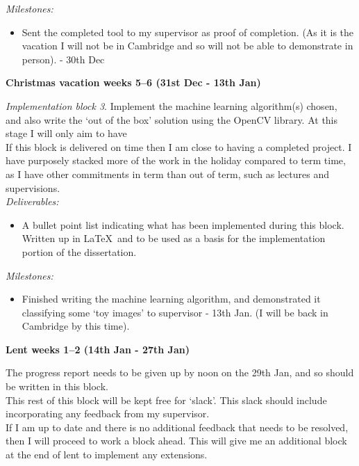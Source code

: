 \documentclass[12pt,a4paper,twoside]{article}
\begin{document}
{\em Milestones:}
\begin{itemize}
    \item 
    Sent the completed tool to my supervisor as proof of completion. (As it is 
    the vacation I will not be in Cambridge and so will not be able to 
    demonstrate in person). - 30th Dec
\end{itemize}




{\bf Christmas vacation weeks 5--6 (31st Dec - 13th Jan)} 

{\em Implementation block 3}. Implement the machine learning algorithm(s) 
chosen, and also write the `out of the box' solution using the OpenCV 
library. At this stage I will only aim to have  \\

If this block is delivered on time then I am close to having a completed 
project. I have purposely stacked more of the work in the holiday compared to 
term time, as I have other commitments in term than out of term, such as 
lectures and supervisions. \\

{\em Deliverables:} 
\begin{itemize} 
    \item 
    A bullet point list indicating what has been implemented during this block. 
    Written up in \LaTeX\ and to be used as a basis for the implementation 
    portion of the dissertation.
\end{itemize}

{\em Milestones:}
\begin{itemize}
    \item 
    Finished writing the machine learning algorithm, and demonstrated it 
    classifying some `toy images' to supervisor - 13th Jan. (I will be back in 
    Cambridge by this time).
\end{itemize}




{\bf Lent weeks 1--2 (14th Jan - 27th Jan)} 

The progress report needs to be given up by noon on the 29th Jan, and so should 
be written in this block. \\

This rest of this block will be kept free for `slack'. This slack should include 
incorporating any feedback from my supervisor. \\

If I am up to date and there is no additional feedback that needs to be resolved, 
then I will proceed to work a block ahead. This will give me an additional block 
at the end of lent to implement any extensions. \\
\end{document}
